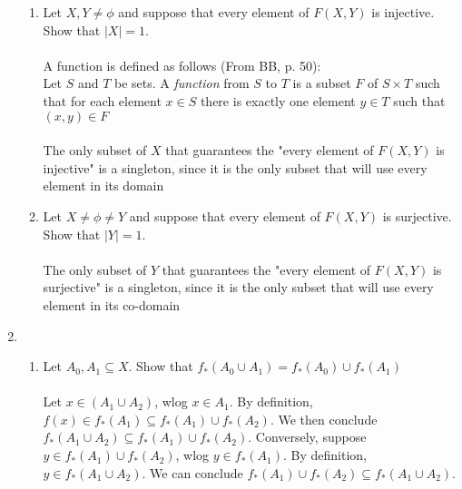 \documentclass[11pt]{article}
\begin{document}
\begin{enumerate}
\begin{enumerate} %
\item Let $X, Y \neq \phi$ and suppose that every element of $F(X,Y)$ is injective.  Show that $|X| = 1$.
\\ \\
A function is defined as follows (From BB, p. 50):\\
Let $S$ and $T$ be sets. A \emph{function} from $S$ to $T$ is a subset $F$ of $S \times T$ such that for each element $x \in S$ there is exactly one element  $y \in T$ such that $(x,y) \in F$
\\ \\
The only subset of $X$ that guarantees the "every element of $F(X,Y)$ is injective" is a singleton, since it is the only subset that will use every element in its domain
%
\\
\item Let $X \neq \phi \neq Y$ and suppose that every element of $F(X,Y)$ is surjective.  Show that $|Y| = 1$.
\\ \\
The only subset of $Y$ that guarantees the "every element of $F(X,Y)$ is surjective" is a singleton, since it is the only subset that will use every element in its co-domain
\\


\end{enumerate} %
\newpage

\item %
\begin{enumerate}
\item Let $A_0 , A_1 \subseteq X$. Show that $f_*(A_0 \cup A_1 ) = f_*(A_0) \cup f_*(A_1)$
\\ \\
Let $x \in (A_1 \cup A_2)$, wlog $x \in A_1$.  By definition, $f(x) \in f_*(A_1) \subseteq f_*(A_1) \cup f_*(A_2).$  We then conclude $f_*(A_1 \cup A_2) \subseteq f_*(A_1) \cup f_*(A_2)$.  Conversely, suppose $y \in f_*(A_1) \cup f_*(A_2)$, wlog $y \in f_*(A_1)$.  By definition, $y \in f_*(A_1 \cup A_2)$.  We can conclude $f_*(A_1) \cup f_*(A_2) \subseteq f_*(A_1 \cup A_2)$.
\\


\end{enumerate}
\end{enumerate}
\end{document}
